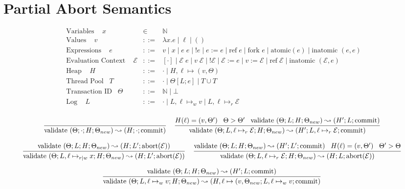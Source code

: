 \documentclass[9pt]{article}
\newcommand{\ctxt}[0]{\mathcal{E}}
\newcommand{\loc}[0]{\ell}
\newcommand{\atomic}[1]{\text{atomic}(#1)}
\newcommand{\alloc}[1]{\text{ref} \; #1}
\newcommand{\commit}[0]{\text{commit}}
\newcommand{\abort}[1]{\text{abort}(#1)}
\newcommand{\fork}[1]{\text{fork } #1}
\newcommand{\inatomic}[1]{\text{inatomic }(#1)}
\newcommand{\validate}[1]{\text{validate }(#1)}
\begin{document}
\begingroup\makeatletter{}\check@mathfonts

\section{Partial Abort Semantics}
\begin{displaymath}
\begin{array}{rcll}
\text{Variables } \;\;\; x &\in& \mathbb{N} \\
\text{Values } \;\;\; v &::=& \lambda x. e \; | \; \loc \; | \; () \\
\text{Expressions } \;\;\; e &::=& v \; | \; x \; | \; e \; e \; | \; !e \; | \; e := e \; | \; \alloc{e} \; | \; \fork{e} \; | \; \atomic{e} \; | \; \inatomic{e, e}\\
\text{Evaluation Context } \;\;\; \ctxt &::=& [\cdot] \; | \; \ctxt \; e \; | \; v \; \ctxt \; | \; ! \ctxt \; | \; \ctxt := e \; | \; v := \ctxt \; | \; \alloc{\ctxt} \; | \; \inatomic{\ctxt, e}\\
\text{Heap } \;\;\; H &::=& \cdot \; | \; H, \loc \mapsto (v, \Theta) \\
\text{Thread Pool} \;\;\; T &::=& \cdot \; | \; \Theta[L; e] \; | \; T \cup T \\
\text{Transaction ID} \;\;\; \Theta &::=& \mathbb{N} \; | \; \bot \\
\text{Log } \;\;\; L &::=& \cdot \; | \; L, \loc \mapsto_w v \; | \; L, \loc \mapsto_r \ctxt \\
\end{array}
\end{displaymath}

\[
\infer[]{\validate{\Theta; \cdot; H; \Theta_{new}} \leadsto (H; \cdot; \commit)}{} \;\;\;
\infer[]{\validate{\Theta; L, \loc \mapsto_r \ctxt; H; \Theta_{new}} \leadsto (H'; L, \loc \mapsto_r \ctxt; \commit)}{H(\loc) = (v, \Theta') \;\;\; \Theta > \Theta' \;\;\; \validate{\Theta; L; H; \Theta_{new}} \leadsto (H'; L; \commit)}
\]

\[
\infer[]{\validate{\Theta; L, \loc \mapsto_{r|w} x; H; \Theta_{new}} \leadsto (H; L'; \abort{\ctxt})}{\validate{\Theta; L; H; \Theta_{new}} \leadsto (H; L'; \abort{\ctxt})} \;\;\;
\infer[]{\validate{\Theta; L, \loc \mapsto_r \ctxt; H; \Theta_{new}} \leadsto (H; L; \abort{\ctxt})}{\validate{\Theta; L; H; \Theta_{new}} \leadsto (H'; L'; \commit) \;\;\; H(\loc) = (v, \Theta') \;\;\; \Theta' > \Theta}
\]

\[
\infer[]{\validate{\Theta; L, \loc \mapsto_w v; H; \Theta_{new}} \leadsto (H, \loc \mapsto (v, \Theta_{new}; L, \loc \mapsto_w v; \commit)}{\validate{\Theta; L; H; \Theta_{new}} \leadsto (H'; L; \commit)}
\]
\end{document}
